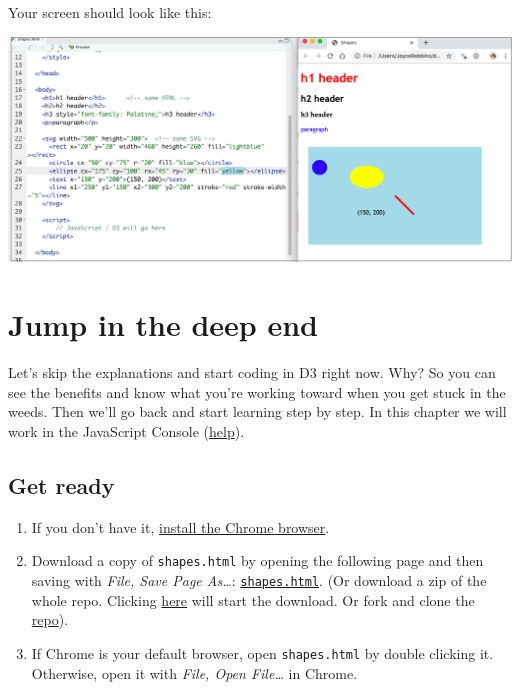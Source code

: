 \documentclass[openany]{book}
\begin{document}
Your screen should look like this:

\begin{center}\includegraphics[width=0.8\linewidth]{images/editor_chrome} \end{center}

\hypertarget{jump}{%
\chapter{Jump in the deep end }\label{jump}}

Let's skip the explanations and start coding in D3 right now. Why? So you can see the benefits and know what you're working toward when you get stuck in the weeds. Then we'll go back and start learning step by step. In this chapter we will work in the JavaScript Console (\href{index.html\#javascript-console}{help}).

\hypertarget{get-ready}{%
\section{Get ready }\label{get-ready}}

\begin{enumerate}
\def\labelenumi{\arabic{enumi}.}
\item
  If you don't have it, \href{https://www.google.com/chrome/}{install the Chrome browser}.
\item
  Download a copy of \texttt{shapes.html} by opening the following page and then saving with \emph{File, Save Page As\ldots{}}: \href{https://raw.githubusercontent.com/jtr13/d3book/master/code/shapes.html}{\texttt{shapes.html}}. (Or download a zip of the whole repo. Clicking \href{https://github.com/jtr13/d3book/archive/master.zip}{here} will start the download. Or fork and clone the \href{https://github.com/jtr13/d3book}{repo}).
\item
  If Chrome is your default browser, open \texttt{shapes.html} by double clicking it. Otherwise, open it with \emph{File, Open File\ldots{}} in Chrome.
\end{enumerate}
\end{document}
